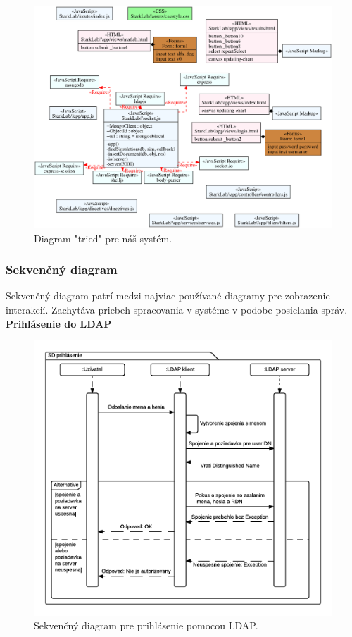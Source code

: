 \begin{figure}[H]
  \centering
  \includegraphics[scale=0.40]{img/diagrams/class.png}
  \caption{Diagram "tried" pre náš systém.}
  \label{img-class-diagram}
\end{figure}

\subsubsection{Sekvenčný diagram}\label{diagram-sequence-section}
Sekvenčný diagram patrí medzi najviac používané diagramy pre zobrazenie interakcií. Zachytáva priebeh spracovania v systéme v podobe posielania správ.\\


\noindent \textbf{Prihlásenie do LDAP}

\begin{figure}[H]
  \centering
  \includegraphics[scale=0.7]{img/diagrams/sequence-ldap.png}
  \caption{Sekvenčný diagram pre prihlásenie pomocou LDAP.}
  \label{img-sequence-ldap-login}
\end{figure}

